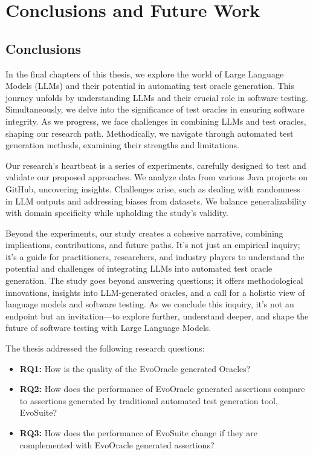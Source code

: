 \chapter{Conclusions and Future Work}
\label{cha:conclusions}
\vspace{0.4 cm}

\section{Conclusions}
\label{sec:conclusions}
\vspace{0.2 cm}

In the final chapters of this thesis, we explore the world of Large Language Models (LLMs) and their potential in automating test oracle generation. This journey unfolds by understanding LLMs and their crucial role in software testing. Simultaneously, we delve into the significance of test oracles in ensuring software integrity. As we progress, we face challenges in combining LLMs and test oracles, shaping our research path. Methodically, we navigate through automated test generation methods, examining their strengths and limitations.

Our research's heartbeat is a series of experiments, carefully designed to test and validate our proposed approaches. We analyze data from various Java projects on GitHub, uncovering insights. Challenges arise, such as dealing with randomness in LLM outputs and addressing biases from datasets. We balance generalizability with domain specificity while upholding the study's validity.

Beyond the experiments, our study creates a cohesive narrative, combining implications, contributions, and future paths. It's not just an empirical inquiry; it's a guide for practitioners, researchers, and industry players to understand the potential and challenges of integrating LLMs into automated test oracle generation. The study goes beyond answering questions; it offers methodological innovations, insights into LLM-generated oracles, and a call for a holistic view of language models and software testing. As we conclude this inquiry, it's not an endpoint but an invitation—to explore further, understand deeper, and shape the future of software testing with Large Language Models.

The thesis addressed the following research questions:

\begin{itemize}
    \item \textbf{RQ1:} How is the quality of the EvoOracle generated Oracles?
    \item \textbf{RQ2:} How does the performance of EvoOracle generated assertions compare to assertions generated by traditional automated test generation tool, EvoSuite?
    \item \textbf{RQ3:} How does the performance of EvoSuite change if they are complemented with EvoOracle generated assertions?
\end{itemize}


